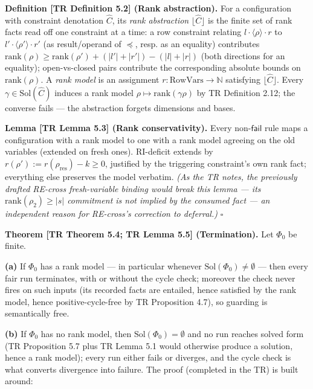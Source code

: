 \documentclass[
  10pt,
  letterpaper,
]{article}
\begin{document}
\textbf{Definition {[}TR Definition 5.2{]} (Rank abstraction).} For a
configuration with constraint denotation \(\widehat{C}\), its \emph{rank
abstraction} \(\lfloor\widehat{C}\rfloor\) is the finite set of rank
facts read off one constraint at a time: a row constraint relating
\(l\cdot\langle\rho\rangle\cdot r\) to
\(l'\cdot\langle\rho'\rangle\cdot r'\) (as result/operand of
\(\preceq\), resp. as an equality) contributes
\(\mathrm{rank}(\rho) \ge \mathrm{rank}(\rho') + (|l'|+|r'|) - (|l|+|r|)\)
(both directions for an equality); open-vs-closed pairs contribute the
corresponding absolute bounds on \(\mathrm{rank}(\rho)\). A \emph{rank
model} is an assignment \(r : \mathrm{RowVars} \to \mathbb{N}\)
satisfying \(\lfloor\widehat{C}\rfloor\). Every
\(\gamma \in \mathrm{Sol}(\widehat{C})\) induces a rank model
\(\rho \mapsto \mathrm{rank}(\gamma\rho)\) by TR Definition 2.12; the
converse fails --- the abstraction forgets dimensions and bases.

\textbf{Lemma {[}TR Lemma 5.3{]} (Rank conservativity).} Every
non-\(\mathsf{fail}\) rule maps a configuration with a rank model to one
with a rank model agreeing on the old variables (extended on fresh
ones). RI-deficit extends by
\(r(\rho') := r(\rho_{\mathrm{res}}) - k \ge 0\), justified by the
triggering constraint's own rank fact; everything else preserves the
model verbatim. \emph{(As the TR notes, the previously drafted RE-cross
fresh-variable binding would break this lemma --- its
\(\mathrm{rank}(\rho_2) \ge |s|\) commitment is not implied by the
consumed fact --- an independent reason for RE-cross's correction to
deferral.)} \(\square\)

\textbf{Theorem {[}TR Theorem 5.4; TR Lemma 5.5{]} (Termination).} Let
\(\Phi_0\) be finite.

\textbf{(a)} If \(\Phi_0\) has a rank model --- in particular whenever
\(\mathrm{Sol}(\Phi_0) \ne \emptyset\) --- then every fair run
terminates, with or without the cycle check; moreover the check never
fires on such inputs (its recorded facts are entailed, hence satisfied
by the rank model, hence positive-cycle-free by TR Proposition 4.7), so
guarding is semantically free.

\textbf{(b)} If \(\Phi_0\) has no rank model, then
\(\mathrm{Sol}(\Phi_0) = \emptyset\) and no run reaches solved form (TR
Proposition 5.7 plus TR Lemma 5.1 would otherwise produce a solution,
hence a rank model); every run either fails or diverges, and the cycle
check is what converts divergence into failure. The proof (completed in
the TR) is built around:
\end{document}
